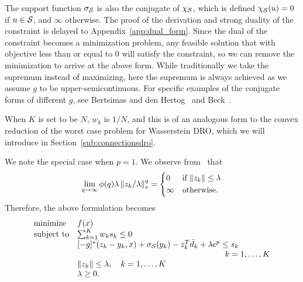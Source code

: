 \documentclass[12pt]{article}
\newcommand{\citep}{\cite}
\theoremstyle{thmstyleone}%
\theoremstyle{thmstyletwo}%
\theoremstyle{thmstylethree}%
\newcommand{\reviewChanges}{}
\begin{document}
The support function $\sigma_ {\mathcal{S}}$ is also the conjugate of $\chi_ {\mathcal{S}}$, which is defined $\chi_{\mathcal{S}}(u) = 0$ if $u \in  \mathcal{S}$, and $\infty$ otherwise.
The proof of the derivation and strong duality of the constraint is delayed to Appendix~\ref{app:dual_form}.
Since the dual of the constraint becomes a minimization problem, any feasible solution that with objective less than or equal to $0$ will satisfy the constraint, so we can remove the minimization to arrive at the above form.
While traditionally we take the supremum instead of maximizing, here the supremum is always achieved as we assume $g$ to be upper-semicontinuous.
For specific examples of the conjugate forms of different $g$, see Bertsimas and den Hertog~\cite[Section 2.5]{robustadaptopt} and Beck~\cite[Chapter 4]{amirbeck}.

When $K$ is set to be $N$, $w_k$ is $1/N$, and this is of an analogous form to the convex reduction of the worst case problem for Wasserstein \gls{DRO}, which we will introduce in Section~\ref{sub:connectionsdro}.

\reviewChanges{
We note the special case when $p = 1$. We observe from~\citep[Section 2.2 Remark 1]{kuhn2019wasserstein} that
\begin{equation*}
	 \lim_{q \rightarrow \infty}\phi(q)\lambda \left\|z_{k}/\lambda \right\|^q_* =
	\begin{dcases} 0 & \text{if}\; \|z_{k} \| \leq \lambda \\
		\infty & \text{otherwise}.
	\end{dcases}
	\end{equation*}
Therefore, the above formulation becomes
\begin{equation}
	\label{eq:robustp1}
	\begin{array}{ll}
		\mbox{minimize} & f(x)\\
		\mbox{subject to} & \sum_{k=1}^{K} w_k s_k  \le 0\\
		& [-g]^*(z_{k} - y_{k}, x) + \sigma_{{\supp}}(y_{k}) - z_{k}^T\bar{d}_k  + \lambda\epsilon^p\leq s_k\\
		&\hspace{6cm} \quad k = 1,\dots, K\\
		& \|z_{k} \| \leq \lambda, \quad k = 1,\dots, K\\
		& \lambda \geq 0.
	\end{array}
\end{equation}}
\end{document}
